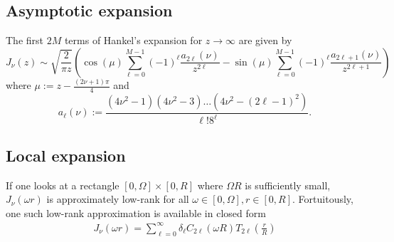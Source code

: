 
\subsection{Asymptotic expansion}

The first $2M$ terms of Hankel's expansion for $z \to \infty$ are given by
\begin{equation}
    J_\nu(z)
    \sim \sqrt{\frac{2}{\pi z}} \left( 
        \cos\left(\mu\right) \sum_{\ell=0}^{M-1} (-1)^\ell \frac{a_{2\ell}(\nu)}{z^{2\ell}}
        - \sin\left(\mu\right) \sum_{\ell=0}^{M-1} (-1)^\ell \frac{a_{2\ell+1}(\nu)}{z^{2\ell+1}}
        \right)
\end{equation}
where $\mu := z - \frac{(2\nu+1)\pi}{4}$ and 
\begin{equation}
    a_\ell(\nu) := \frac{(4\nu^2 - 1)(4\nu^2 - 3)\dots(4\nu^2 - (2\ell-1)^2)}{\ell! 8^\ell}.
\end{equation}



\subsection{Local expansion}

If one looks at a rectangle $[0, \Omega] \times [0, R]$ where $\Omega R$ is
sufficiently small, $J_\nu(\omega r)$ is approximately low-rank for all $\omega
\in [0, \Omega], r \in [0, R]$. Fortuitously, one such low-rank approximation is
available in closed form \cite{wimp1962polynomial}
\begin{align}
    J_\nu(\omega r) = \sum_{\ell=0}^\infty \delta_\ell C_{2\ell}(\omega R) T_{2\ell}\left( \frac{r}{R} \right)
\end{align}


